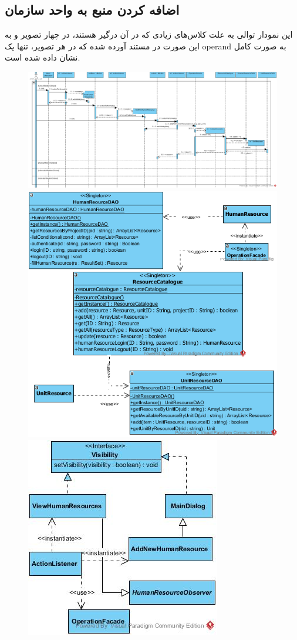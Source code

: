 \begin{landscape}
\newpage
\section{اضافه کردن منبع به واحد سازمان}
این نمودار توالی به علت کلاس‌های زیادی که در آن درگیر هستند، در چهار تصویر و به این صورت در مستند آورده شده که در هر تصویر، تنها یک operand به صورت کامل نشان داده شده است.
\begin{figure}[H]
	\centering
	\includegraphics[scale=0.5]{img/sequence-design/AddResourceToUnit_HUMAN}
	\includegraphics[scale=0.5]{img/sequence-design/AddResourceToUnit_HUMANC}
	\includegraphics[scale=0.5]{img/sequence-design/AddResourceToUnit_HUMANUI}

\end{figure}
\end{landscape}
